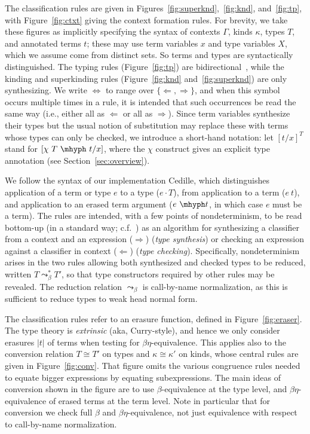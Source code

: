 \documentclass{article}
\newcommand{\tpcheck}[0]{\Leftarrow}
\newcommand{\tpsynth}[0]{\Rightarrow}
\begin{document}
The classification rules are given in
Figures~\ref{fig:superknd},~\ref{fig:knd}, and~\ref{fig:tp}, with
Figure~\ref{fig:ctxt} giving the context formation rules.
For brevity, we take these figures as implicitly specifying the syntax of
contexts \(\Gamma\), kinds $\kappa$, types $T$, and annotated terms $t$; these
may use term variables $x$ and type variables $X$, which we assume come from
distinct sets.  So terms and types are syntactically distinguished.
The typing rules (Figure~\ref{fig:tp}) are
bidirectional~\cite{pierce+00}, while the kinding and superkinding
rules (Figure~\ref{fig:knd} and~\ref{fig:superknd}) are only
synthesizing.  We write $\Leftrightarrow$ to range over
$\{\tpcheck,\tpsynth\}$, and when this symbol occurs multiple times in a rule,
it is intended that such occurrences be read the same way (i.e., either all as
\(\tpcheck\) or all as \(\tpsynth\)).
Since term variables synthesize their types but the usual notion of substitution may
replace these with terms whose types can only be checked, we introduce a
short-hand notation: let \([t/x]^T\) stand for \([\chi\ T\ \mhyph\ t/x]\),
where the \(\chi\) construct gives an explicit type annotation (see
Section~\ref{sec:overview}).

We follow the syntax of our implementation
Cedille, which distinguishes application of a term or type $e$ to a
type ($e \cdot T$), from application to a term ($e\ t$), and
application to an erased term argument ($e\ \mhyph t$, in which case \(e\) must
be a term).
The rules are intended, with a few points of nondeterminism, to be read
bottom-up (in a standard way;
c.f.~\cite{peytonjones07,Pfe01_Lecture-Notes-on-Bidirectional-Type-Checking}) as
an algorithm for synthesizing a classifier from a context and an expression
($\tpsynth$) (\emph{type synthesis}) or checking an expression against a classifier in context
($\tpcheck$) (\emph{type checking}).
Specifically, nondeterminism arises in the two rules allowing both synthesized
and checked types to be reduced, written \(T \leadsto^*_\beta T'\), so that type
constructors required by other rules may be revealed.
The reduction relation \(\leadsto_\beta\) is call-by-name normalization, as this
is sufficient to reduce types to weak head normal form.

The classification rules refer to an erasure function, defined in
Figure~\ref{fig:eraser}.  The type theory is \emph{extrinsic} (aka,
Curry-style), and hence we only consider erasures $|t|$ of terms when
testing for $\beta\eta$-equivalence.  This applies also to the conversion
relation $T\cong T'$ on types and \(\kappa \cong \kappa'\) on kinds, whose central rules are given in
Figure~\ref{fig:conv}.  That figure omits the various congruence rules
needed to equate bigger expressions by equating subexpressions.  The
main ideas of conversion shown in the figure are to use
$\beta$-equivalence at the type level, and $\beta\eta$-equivalence of
erased terms at the term level.
Note in particular that for conversion we check full \(\beta\) and
\(\beta\eta\)-equivalence, not just equivalence with respect to call-by-name
normalization.
\end{document}
